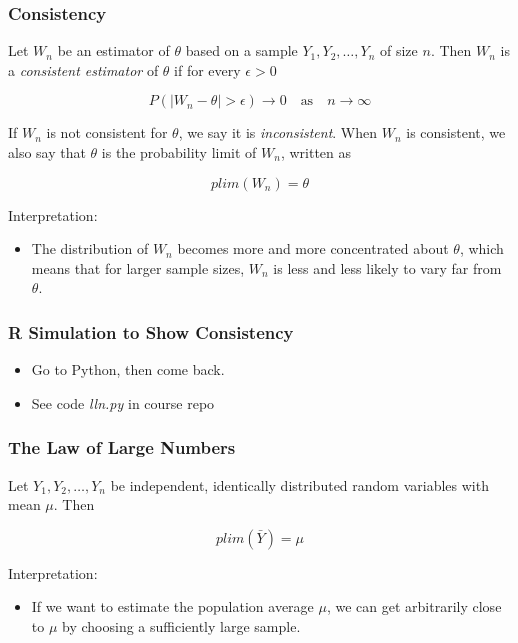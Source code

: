 \documentclass[12pt]{beamer}
\begin{document}
\begin{frame}
\frametitle{Consistency}
Let $W_{n}$ be an estimator of $\theta$ based on a sample $Y_{1}, Y_{2}, \ldots, Y_{n}$ of size $n$. Then
$W_{n}$ is a \emph{consistent estimator} of $\theta$ if for every $\epsilon > 0$

\vspace{2mm}
\begin{equation*}
P(|W_{n} - \theta| > \epsilon) \rightarrow 0 \quad \mbox{as} \quad n \rightarrow \infty
\end{equation*}

\vspace{3.5mm}
If $W_{n}$ is not consistent for $\theta$, we say it is \emph{inconsistent}. When $W_{n}$ is consistent,
we also say that $\theta$ is the probability limit of $W_{n}$, written as 

\begin{equation*}
plim(W_{n}) = \theta
\end{equation*}

\vspace{3.5mm}
Interpretation:

\begin{itemize}
 \item[] The distribution of $W_{n}$ becomes more and more concentrated about $\theta$, which means
         that for larger sample sizes, $W_{n}$ is less and less likely to vary far from $\theta$.
\end{itemize}
\end{frame}


\begin{frame}
\frametitle{R Simulation to Show Consistency}
\begin{itemize}
 \item Go to Python, then come back.
 \item See code \emph{lln.py} in course repo
\end{itemize}
\end{frame}


\begin{frame}
\frametitle{The Law of Large Numbers}
Let $Y_{1}, Y_{2}, \ldots, Y_{n}$ be independent, identically distributed random variables with mean
$\mu$. Then

\vspace{2mm}
\begin{equation*}
plim(\bar{Y}) = \mu
\end{equation*}

\vspace{3.5mm}
Interpretation:

\begin{itemize}
 \item[] If we want to estimate the population average $\mu$, we can get arbitrarily close to $\mu$ by
         choosing a sufficiently large sample.
\end{itemize}
\end{frame}
\end{document}
